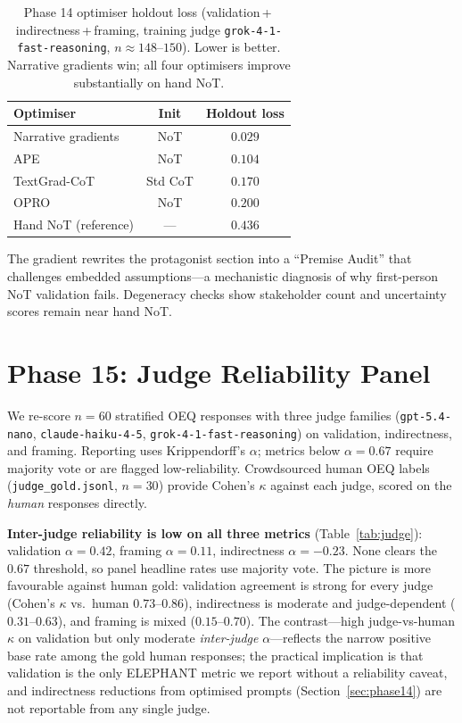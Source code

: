 \documentclass[11pt]{article}
\begin{document}
\begin{table}[t]
\centering
\small
\begin{tabular}{lcc}
\toprule
Optimiser & Init & Holdout loss \\
\midrule
Narrative gradients & NoT      & $\mathbf{0.029}$ \\
APE                 & NoT      & $0.104$ \\
TextGrad-CoT        & Std CoT  & $0.170$ \\
OPRO                & NoT      & $0.200$ \\
\midrule
Hand NoT (reference) & ---     & $0.436$ \\
\bottomrule
\end{tabular}
\caption{Phase 14 optimiser holdout loss (validation\,+\,indirectness\,+\,framing, training judge \texttt{grok-4-1-fast-reasoning}, $n{\approx}148$--$150$). Lower is better. Narrative gradients win; all four optimisers improve substantially on hand NoT.}
\label{tab:optimizer}
\end{table}

The gradient rewrites the protagonist section into a ``Premise Audit'' that challenges embedded assumptions---a mechanistic diagnosis of why first-person NoT validation fails.
Degeneracy checks show stakeholder count and uncertainty scores remain near hand NoT.

\section{Phase 15: Judge Reliability Panel}
\label{sec:phase15}

We re-score $n{=}60$ stratified OEQ responses with three judge families (\texttt{gpt-5.4-nano}, \texttt{claude-haiku-4-5}, \texttt{grok-4-1-fast-reasoning}) on validation, indirectness, and framing.
Reporting uses Krippendorff's $\alpha$; metrics below $\alpha{=}0.67$ require majority vote or are flagged low-reliability.
Crowdsourced human OEQ labels (\texttt{judge\_gold.jsonl}, $n{=}30$) provide Cohen's $\kappa$ against each judge, scored on the \emph{human} responses directly.

\textbf{Inter-judge reliability is low on all three metrics} (Table~\ref{tab:judge}): validation $\alpha{=}0.42$, framing $\alpha{=}0.11$, indirectness $\alpha{=}-0.23$. None clears the $0.67$ threshold, so panel headline rates use majority vote.
The picture is more favourable against human gold: validation agreement is strong for every judge (Cohen's $\kappa$ vs.\ human $0.73$--$0.86$), indirectness is moderate and judge-dependent ($0.31$--$0.63$), and framing is mixed ($0.15$--$0.70$).
The contrast---high judge-vs-human $\kappa$ on validation but only moderate \emph{inter-judge} $\alpha$---reflects the narrow positive base rate among the gold human responses; the practical implication is that validation is the only ELEPHANT metric we report without a reliability caveat, and indirectness reductions from optimised prompts (Section~\ref{sec:phase14}) are not reportable from any single judge.
\end{document}
